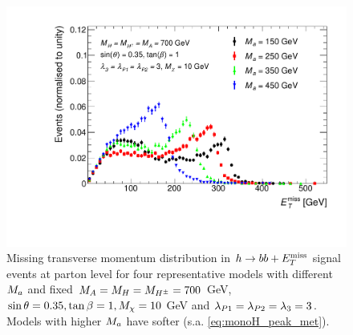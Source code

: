 \begin{figure}[tbp]
\centering
\includegraphics[width=\textwidth]{texinputs/04_grid/figures/monoHbb_m_small_a_scan_MET_liny_norm2one.pdf}
\caption[$\MET$ distribution in  $h\rightarrow bb + \MET$ events for different $\ma$]
{
Missing transverse momentum distribution in $h\rightarrow bb + \MET$ signal events at parton level for four representative models with different $\ma$ 
and fixed $ M_{A}=M_{H}=M_{H^{\pm}}= 700$ GeV, $ \sin\theta = 0.35, \tan\beta = 1, M_{\chi} = 10$ GeV and $ \lambda_{P1} = \lambda_{P2} = \lambda_{3} = 3 $. 
Models with higher $\ma$ have softer \met (s.a. \autoref{eq:monoH_peak_met}).
%
}
\label{fig:monoHbb_ma_scan_met}
\end{figure}

